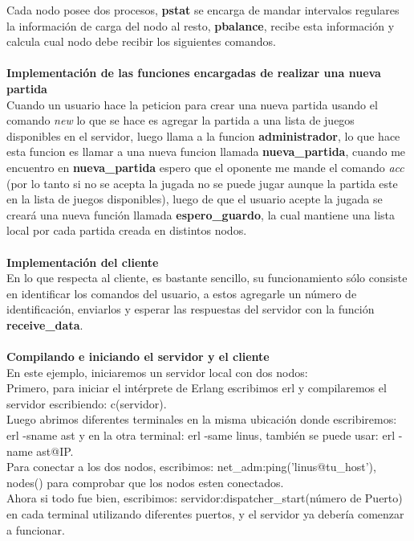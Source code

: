 \documentclass{article}
\begin{document}
Cada nodo posee dos procesos, \textbf{pstat} se encarga de mandar intervalos regulares la 
información de carga del nodo al resto, \textbf{pbalance}, recibe esta información y calcula cual 
nodo debe recibir los siguientes comandos.  \\ \\
{\large \textbf{Implementación de las funciones encargadas de realizar una nueva partida}} \\ 
Cuando un usuario hace la peticion para crear una nueva partida usando el comando 
\textit{new} lo que se hace es agregar la partida a una lista de juegos disponibles en el servidor, 
luego llama a la funcion \textbf{administrador}, lo que hace esta funcion es llamar a una nueva 
funcion llamada \textbf{nueva\_partida}, cuando me encuentro en \textbf{nueva\_partida} espero que el 
oponente me mande el comando \textit{acc} (por lo tanto si no se acepta la jugada no se puede 
jugar aunque la partida este en la lista de juegos disponibles), luego de que el usuario 
acepte la jugada se creará una nueva función llamada \textbf{espero\_guardo}, la cual mantiene 
una lista local por cada partida creada en distintos nodos. \\ \\
{\large \textbf{Implementación del cliente }} \\
En lo que respecta al cliente, es bastante sencillo, su funcionamiento sólo consiste en 
identificar los comandos del usuario, a estos agregarle un número de identificación, 
enviarlos y esperar las respuestas del servidor con la función \textbf{receive\_data}.  \\ \\
{\large \textbf{Compilando e iniciando el servidor y el cliente} } \\
En este ejemplo, iniciaremos un servidor local con dos nodos: \\
Primero, para iniciar el intérprete de Erlang escribimos erl y compilaremos el servidor escribiendo:
c(servidor). \\
Luego abrimos diferentes terminales en la misma ubicación donde escribiremos: erl -sname ast y en la otra terminal:
erl -same linus, también se puede usar: erl -name ast@IP. \\
Para conectar a los dos nodos, escribimos: net\_adm:ping('linus@tu\_host'), nodes() para comprobar que los nodos esten
conectados. \\
Ahora si todo fue bien, escribimos:
servidor:dispatcher\_start(número de Puerto) en cada terminal utilizando diferentes
puertos, y el servidor ya debería comenzar a funcionar. \\
\end{document}
